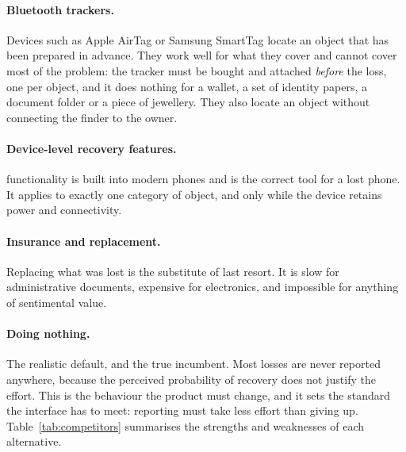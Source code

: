 \paragraph{Bluetooth trackers.} Devices such as Apple AirTag or Samsung
SmartTag locate an object that has been prepared in advance. They work well for
what they cover and cannot cover most of the problem: the tracker must be bought
and attached \emph{before} the loss, one per object, and it does nothing for a
wallet, a set of identity papers, a document folder or a piece of jewellery.
They also locate an object without connecting the finder to the owner.

\paragraph{Device-level recovery features.}  functionality is
built into modern phones and is the correct tool for a lost phone. It applies to
exactly one category of object, and only while the device retains power and
connectivity.

\paragraph{Insurance and replacement.} Replacing what was lost is the substitute
of last resort. It is slow for administrative documents, expensive for
electronics, and impossible for anything of sentimental value.

\paragraph{Doing nothing.} The realistic default, and the true incumbent. Most
losses are never reported anywhere, because the perceived probability of
recovery does not justify the effort. This is the behaviour the product must
change, and it sets the standard the interface has to meet: reporting must take
less effort than giving up. Table~\ref{tab:competitors} summarises the strengths
and weaknesses of each alternative.

